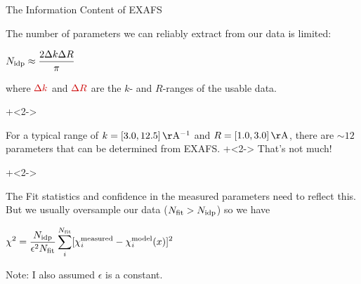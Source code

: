 \begin{slide}{The Information Content of EXAFS}

\begin{cenpage}{135mm}
    The number of parameters we can reliably extract from our data is limited:
    \vspace{1mm}


    \begin{postitbox}{26mm}
      $\displaystyle  N_{\rm idp} \approx { \frac{2 \Delta k \Delta R}{\pi}}  $
    \end{postitbox}

    \vmm

    where $\Red{ \Delta k}$ and $\Red{ \Delta R}$ are the $k$- and
    $R$-ranges of the usable data.

    \onslide+<2->
    \vmm\vmm

    For a typical range of $k = [3.0, 12.5] \rm\,\AA^{-1}$ and $R = [1.0,
    3.0] \rm\,\AA$, there are $\sim 12$ parameters that can be determined
    from EXAFS.      \onslide+<2-> That's not much!

    \onslide+<2->
    \vmm\vmm

    The Fit statistics and confidence in the measured parameters need to
    reflect this.  But we usually oversample our data ($N_{\rm fit} >
    N_{\rm idp} $) so we have

    \begin{postitbox}{56mm}
      $ \displaystyle
      \chi^2  =  \frac{ N_{\rm idp}}{\epsilon^2 N_{\rm fit}}
      \sum_i^{N_{\rm fit}} [\chi_i^{\rm measured} - \chi_i^{\rm model}({x})]^2
      $
    \end{postitbox}

    Note: I also assumed $\epsilon$ is a constant.

\vfill
\end{cenpage}
\end{slide}


